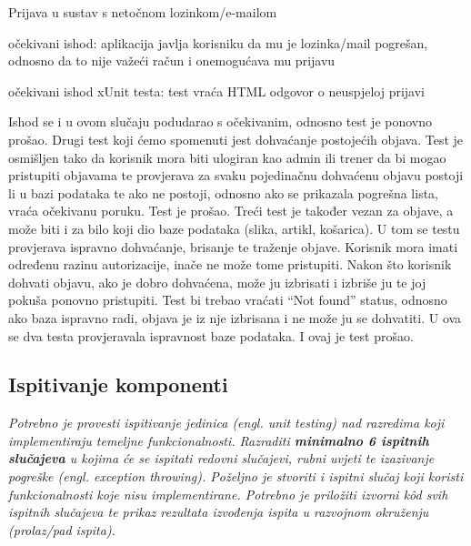 		 	\begin{packed_item}
		 	
		 	\item Prijava u sustav s netočnom lozinkom/e-mailom
		 	\item[] \begin{packed_enum}
		 		\item očekivani ishod: aplikacija javlja korisniku da mu je lozinka/mail pogrešan, odnosno da to nije važeći račun i onemogućava mu prijavu
		 		\item očekivani ishod xUnit testa: test vraća HTML odgovor o neuspjeloj prijavi
		 		
		 	\end{packed_enum}
		 \end{packed_item}
		 \textnormal {Ishod se i u ovom slučaju podudarao s očekivanim, odnosno test je ponovno prošao.}
		 \bigbreak
		 \textnormal {Drugi test koji ćemo spomenuti jest dohvaćanje postojećih objava. Test je osmišljen tako da korisnik mora biti ulogiran kao admin ili trener da bi mogao pristupiti objavama te provjerava za svaku pojedinačnu dohvaćenu objavu postoji li u bazi podataka te ako ne postoji, odnosno ako se prikazala pogrešna lista, vraća očekivanu poruku. Test je prošao.}
		 \bigbreak
		 \textnormal{Treći test je također vezan za objave, a može biti i za bilo koji dio baze podataka (slika, artikl, košarica). U tom se testu provjerava ispravno dohvaćanje, brisanje te traženje objave. Korisnik mora imati određenu razinu autorizacije, inače ne može tome pristupiti. Nakon što korisnik dohvati objavu, ako je dobro dohvaćena, može ju izbrisati i izbriše ju te joj pokuša ponovno pristupiti. Test bi trebao vraćati “Not found” status, odnosno ako baza ispravno radi, objava je iz nje izbrisana i ne može ju se dohvatiti. U ova se dva testa provjeravala ispravnost baze podataka. I ovaj je test prošao.
		 }
	
			
			\subsection{Ispitivanje komponenti}
			\textit{Potrebno je provesti ispitivanje jedinica (engl. unit testing) nad razredima koji implementiraju temeljne funkcionalnosti. Razraditi \textbf{minimalno 6 ispitnih slučajeva} u kojima će se ispitati redovni slučajevi, rubni uvjeti te izazivanje pogreške (engl. exception throwing). Poželjno je stvoriti i ispitni slučaj koji koristi funkcionalnosti koje nisu implementirane. Potrebno je priložiti izvorni kôd svih ispitnih slučajeva te prikaz rezultata izvođenja ispita u razvojnom okruženju (prolaz/pad ispita). }
			
